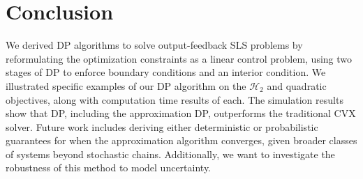\section{Conclusion}\label{sec:conclusion}
We derived DP algorithms to solve output-feedback SLS problems by reformulating the optimization constraints as a linear control problem,
using two stages of DP to enforce boundary conditions and an interior condition. We illustrated specific examples of our DP algorithm on the $\mathcal{H}_2$ and quadratic objectives,
along with computation time results of each. The simulation results show that DP, including the approximation DP, outperforms the traditional CVX solver. 
Future work includes deriving either deterministic or probabilistic guarantees for when the approximation algorithm converges, given broader classes of systems beyond 
stochastic chains. Additionally, we want to investigate the robustness of this method to model uncertainty.


